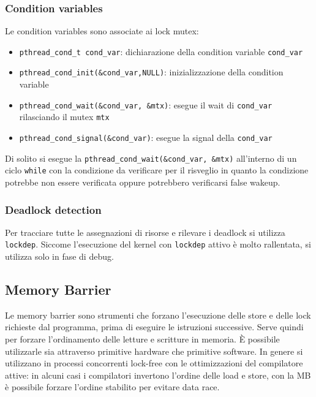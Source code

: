 \documentclass[a4paper]{article}
\begin{document}
\subsubsection*{Condition variables}
Le condition variables sono associate ai lock mutex:
\begin{itemize}
	\item \verb|pthread_cond_t cond_var|: dichiarazione della condition variable \verb|cond_var|
	\item \verb|pthread_cond_init(&cond_var,NULL)|: inizializzazione della condition variable
	\item \verb|pthread_cond_wait(&cond_var, &mtx)|: esegue il wait di \verb|cond_var| rilasciando il mutex \verb|mtx|
	\item \verb|pthread_cond_signal(&cond_var)|: esegue la signal della \verb|cond_var|
\end{itemize}
Di solito si esegue la \verb|pthread_cond_wait(&cond_var, &mtx)| all'interno di un ciclo \verb|while| con la condizione da
verificare per il risveglio in quanto la condizione potrebbe non essere verificata oppure potrebbero verificarsi false wakeup.

\subsubsection*{Deadlock detection}
Per tracciare tutte le assegnazioni di risorse e rilevare i deadlock si utilizza \verb|lockdep|. Siccome l'esecuzione del kernel
con \verb|lockdep| attivo è molto rallentata, si utilizza solo in fase di debug.


\subsection{Memory Barrier}
Le memory barrier sono strumenti che forzano l'esecuzione delle store e delle lock richieste dal programma, prima di eseguire
le istruzioni successive. Serve quindi per forzare l'ordinamento delle letture e scritture in memoria. È possibile utilizzarle
sia attraverso primitive hardware che primitive software. In genere si utilizzano in processi concorrenti lock-free con le
ottimizzazioni del compilatore attive: in alcuni casi i compilatori invertono l'ordine delle load e store, con la MB è possibile
forzare l'ordine stabilito per evitare data race.
\end{document}
